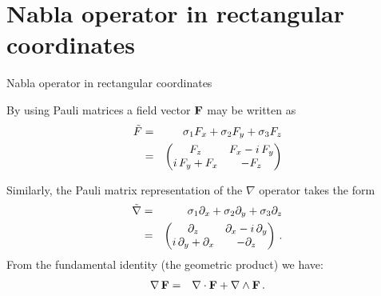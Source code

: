 \documentclass[handout,10pt]{beamer}
\begin{document}
\section{Nabla operator in rectangular coordinates}
\begin{frame}[shrink=00]{Nabla operator in rectangular coordinates}


By using Pauli matrices a field vector $\mathbf{F}$ may be written as
%
\begin{eqnarray}
 \tilde{F}  & = &  \sigma_1 F_x + \sigma_2 F_y  + \sigma_3 F_z \nonumber \\
       & = &  \begin{pmatrix}{F}_{z} & {F}_{x}-i\,{F}_{y}\cr i\,{F}_{y}+{F}_{x} & -{F}_{z}\end{pmatrix}  
\end{eqnarray}

%
\pause
Similarly, the Pauli matrix representation of the $\nabla$ operator takes the form
%
\begin{eqnarray}
\tilde{\nabla}  & = &  
 \sigma_1 \partial_x + \sigma_2 \partial_y  + \sigma_3 \partial_z \nonumber \\
  & = &  
 \begin{pmatrix}{\partial}_{z} & {\partial}_{x}-i\,{\partial}_{y}\cr i\,{\partial}_{y}+{\partial}_{x} & -{\partial}_{z}\end{pmatrix} \, .
\end{eqnarray}
%
From the fundamental identity (the geometric product) we have:
%
\begin{eqnarray}
 \nabla \, {\bf F}  & = &   \nabla \cdot \mathbf{F} + \nabla \wedge \mathbf{F}   \, .
\end{eqnarray}
%


\end{frame}
\end{document}
